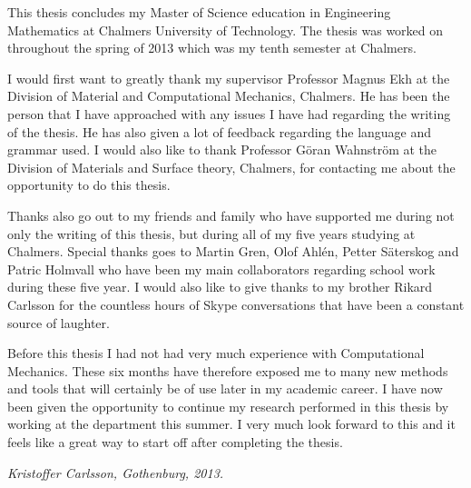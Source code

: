 \documentclass[preface.tex]{subfiles}
\begin{document}
This thesis concludes my Master of Science education in Engineering Mathematics at Chalmers University of Technology. The thesis was worked on throughout the spring of 2013 which was my tenth semester at Chalmers.

I would first want to greatly thank my supervisor Professor Magnus Ekh at the Division of Material and Computational Mechanics, Chalmers. He has been the person that I have approached with any issues I have had regarding the writing of the thesis.  He has also given a lot of feedback regarding the language and grammar used. I would also like to thank Professor Göran Wahnström at the Division of Materials and Surface theory, Chalmers, for contacting me about the opportunity to do this thesis. 

Thanks also go out to my friends and family who have supported me during not only the writing of this thesis, but during all of my five years studying at Chalmers. Special thanks goes to Martin Gren, Olof Ahlén, Petter Säterskog and Patric Holmvall who have been my main collaborators regarding school work during these five year. I would also like to give thanks to my brother Rikard Carlsson for the countless hours of Skype conversations that have been a constant source of laughter.

Before this thesis I had not had very much experience with Computational Mechanics. These six months have therefore exposed me to many new methods and tools that will certainly be of use later in my academic career. I have now been given the opportunity to continue my research performed in this thesis by working at the department this summer. I very much look forward to this and it feels like a great way to start off after completing the thesis.

\textit{Kristoffer Carlsson, Gothenburg, 2013.}
\end{document}
